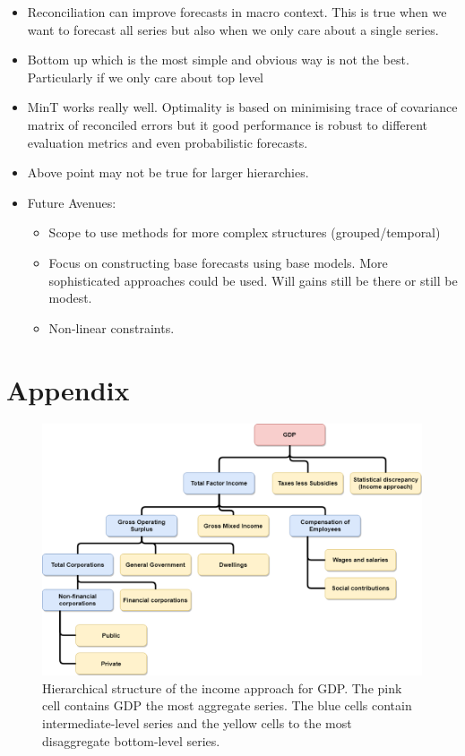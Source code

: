 \documentclass[graybox]{svmult}
\begin{document}
\begin{itemize}
	\item Reconciliation can improve forecasts in macro context.  This is true when we want to forecast all series but also when we only care about a single series.
	\item Bottom up which is the most simple and obvious way is not the best.  Particularly if we only care about top level
	\item MinT works really well.  Optimality is based on minimising trace of covariance matrix of reconciled errors but it good performance is robust to different evaluation metrics and even probabilistic forecasts.
	\item Above point may not be true for larger hierarchies.
	\item Future Avenues:
	\begin{itemize}
		\item Scope to use methods for more complex structures (grouped/temporal)
		\item Focus on constructing base forecasts using base models.  More sophisticated approaches could be used.  Will gains still be there or still be modest.
		\item Non-linear constraints.
	\end{itemize}
\end{itemize}

\clearpage
\section*{Appendix}

\begin{figure}[H]
	\centering
	\includegraphics[width=\textwidth]{Figs/IncomeApproach.PNG}
	\caption{Hierarchical structure of the income approach for GDP. The pink cell contains GDP the most aggregate series. The blue cells contain intermediate-level series and the yellow cells to the most disaggregate bottom-level series.}\label{fig:GDP_I}
\end{figure}
\end{document}
